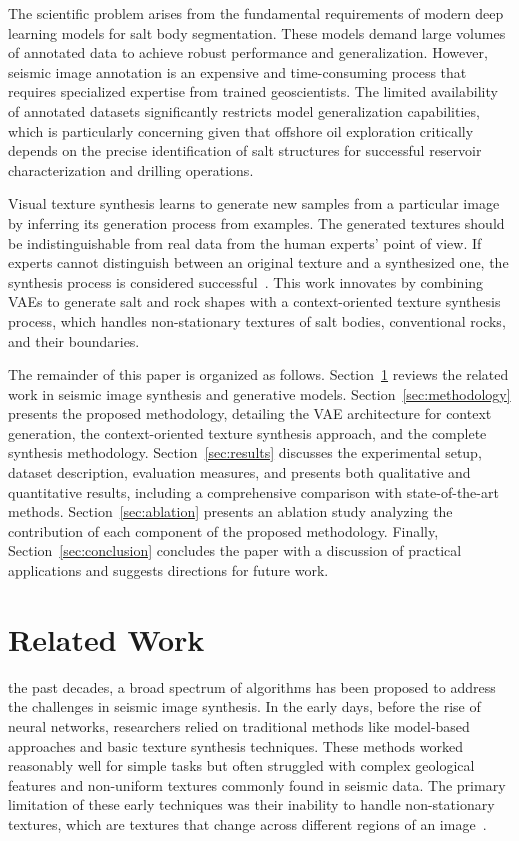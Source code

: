 \documentclass{ieeeaccess}
\begin{document}
The scientific problem arises from the fundamental requirements of modern deep learning models for salt body segmentation. These models demand large volumes of annotated data to achieve robust performance and generalization. However, seismic image annotation is an expensive and time-consuming process that requires specialized expertise from trained geoscientists. The limited availability of annotated datasets significantly restricts model generalization capabilities, which is particularly concerning given that offshore oil exploration critically depends on the precise identification of salt structures for successful reservoir characterization and drilling operations.

Visual texture synthesis learns to generate new samples from a particular image by inferring its generation process from examples. The generated textures should be indistinguishable from real data from the human experts' point of view. If experts cannot distinguish between an original texture and a synthesized one, the synthesis process is considered successful~\cite{Gatys2015}. This work innovates by combining VAEs to generate salt and rock shapes with a context-oriented texture synthesis process, which handles non-stationary textures of salt bodies, conventional rocks, and their boundaries. 

The remainder of this paper is organized as follows. Section~\ref{sec:related} reviews the related work in seismic image synthesis and generative models. Section~\ref{sec:methodology} presents the proposed methodology, detailing the VAE architecture for context generation, the context-oriented texture synthesis approach, and the complete synthesis methodology. Section~\ref{sec:results} discusses the experimental setup, dataset description, evaluation measures, and presents both qualitative and quantitative results, including a comprehensive comparison with state-of-the-art methods. Section~\ref{sec:ablation} presents an ablation study analyzing the contribution of each component of the proposed methodology. Finally, Section~\ref{sec:conclusion} concludes the paper with a discussion of practical applications and suggests directions for future work.

\section{Related Work}
\label{sec:related}

 the past decades, a broad spectrum of algorithms has been proposed to address the challenges in seismic image synthesis. In the early days, before the rise of neural networks, researchers relied on traditional methods like model-based approaches and basic texture synthesis techniques. These methods worked reasonably well for simple tasks but often struggled with complex geological features and non-uniform textures commonly found in seismic data. The primary limitation of these early techniques was their inability to handle non-stationary textures, which are textures that change across different regions of an image~\cite{Zhou2018}.
\end{document}
